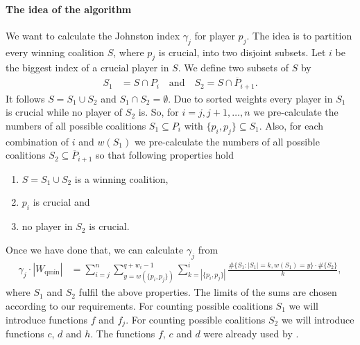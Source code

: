 \documentclass[review]{elsarticle}
\theoremstyle{defn}
\theoremstyle{Pseudo-Code}
\begin{document}
\paragraph{The idea of the algorithm}
We want to calculate the Johnston index $\gamma_j$ for player $p_j$.
The idea is to partition every winning coalition $S$, where $p_j$ is crucial, into two disjoint subsets. Let $i$ be the biggest index of a crucial player in $S$. We define two subsets of $S$ by
\begin{align*}
  S_1
  &=
  S\cap P_i
\quad 
\text{and}
\quad
  S_2
  =
  S\cap \overline{P}_{i+1}
  .
\end{align*}
It follows $S=S_1\cup S_2$ and $S_1\cap S_2=\emptyset$. Due to sorted weights every player in $S_1$ is crucial while no player of $S_2$ is.
So, for $i=j,j+1,\dots,n$ we pre-calculate the numbers of all possible coalitions  $S_1\subseteq P_i$ with $\{p_i,p_j\}\subseteq S_1$.
Also, for each combination of $i$ and $w(S_1)$ we pre-calculate the numbers of all possible coalitions $S_2\subseteq \overline{P}_{i+1}$ so that following properties hold
\begin{enumerate}
  \item $S=S_1\cup S_2$ is a winning coalition,
  \item $p_i$ is crucial and
  \item no player in $S_2$ is crucial.
\end{enumerate}
Once we have done that, we can calculate $\gamma_j$ from
\begin{align*}
  \gamma_j\cdot |W_\text{qmin}|
  &=
  \sum_{i=j}^n
  \sum_{y=w(\{ p_i,p_j \})}^{q+w_i-1}
  \sum_{k=|\{ p_i,p_j \}|}^i
  \frac{\#\{S_1:|S_1|=k, w(S_1)=y\}
  \cdot
  \#\{S_2\}}{k}
  ,
\end{align*}
where $S_1$ and $S_2$ fulfil the above properties. 
The limits of the sums are chosen according to our requirements.
For counting possible coalitions $S_1$ we will introduce functions $f$ and $f_j$. For counting possible coalitions $S_2$ we will introduce functions $c$, $d$ and $h$. The functions $f$, $c$ and $d$ were already used by \cite{Uno2003}.
\end{document}
